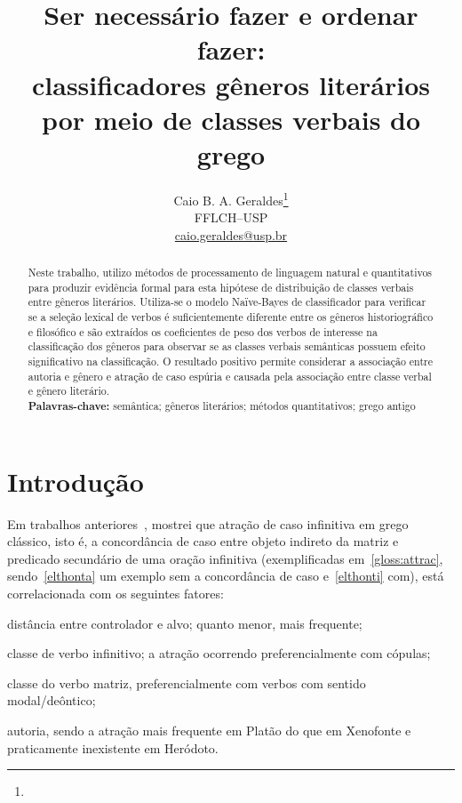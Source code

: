 \documentclass[a4paper,article,12pt,oneside]{memoir}
\title{Ser necessário fazer e ordenar fazer:\\{\Large classificadores gêneros literários por meio de classes verbais do grego}}
\author{Caio B. A. Geraldes\thanks{\agradecimentos}\vspace{5pt}\\{\normalsize{}FFLCH--USP}\\{\normalsize\url{caio.geraldes@usp.br}}}
\begin{document}
\maketitle%

\begin{abstract}
	\noindent Neste trabalho, utilizo métodos de processamento de linguagem natural e quantitativos para produzir evidência formal para esta hipótese de distribuição de classes verbais entre gêneros literários. Utiliza-se o modelo Naïve-Bayes de classificador para verificar se a seleção lexical de verbos é suficientemente diferente entre os gêneros historiográfico e filosófico e são extraídos os coeficientes de peso dos verbos de interesse na classificação dos gêneros para observar se as classes verbais semânticas possuem efeito significativo na classificação. O resultado positivo permite considerar a associação entre autoria e gênero e atração de caso espúria e causada pela associação entre classe verbal e gênero literário.\vspace{4pt}\\
	\noindent \textbf{Palavras-chave:} semântica; gêneros literários; métodos quantitativos; grego antigo
\end{abstract}

\chapter{Introdução}

Em trabalhos anteriores~\cite{Geraldes2020,Geraldes2021}, mostrei que atração de caso infinitiva em grego clássico, isto é, a concordância de caso entre objeto indireto da matriz e predicado secundário de uma oração infinitiva (exemplificadas em~\ref{gloss:attrac}, sendo~\ref{elthonta} um exemplo sem a concordância de caso e~\ref{elthonti} com), está correlacionada com os seguintes fatores:
\begin{inparaenum}[(a)]
	\item distância entre controlador e alvo; quanto menor, mais frequente;
	\item classe de verbo infinitivo; a atração ocorrendo preferencialmente com cópulas;
	\item classe do verbo matriz, preferencialmente com verbos com sentido modal\slash{}deôntico;
	\item autoria, sendo a atração mais frequente em Platão do que em Xenofonte e praticamente inexistente em Heródoto.
\end{inparaenum}
\end{document}
